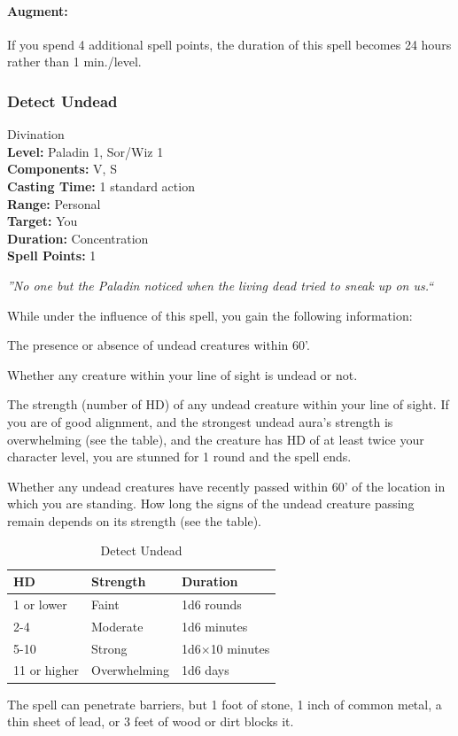 \paragraph{Augment:} If you spend 4 additional spell points, the duration of this spell becomes 24 hours rather than 1 min./level.
\subsubsection{Detect Undead}
\label{Spell:DetectUndead}
Divination
\\ \textbf{Level:} Paladin 1, Sor/Wiz 1
\\ \textbf{Components:} V, S
\\ \textbf{Casting Time:} 1 standard action
\\ \textbf{Range:} Personal
\\ \textbf{Target:} You
\\ \textbf{Duration:} Concentration
\\ \textbf{Spell Points:} 1

\emph{''No one but the Paladin noticed when the living dead tried to sneak up on us.``}

While under the influence of this spell, you gain the following information:
\begin{list}{}{\leftmargin=1em}
 \item The presence or absence of undead creatures within 60'.
 \item Whether any creature within your line of sight is undead or not.
 \item The strength (number of HD) of any undead creature within your line of sight.
If you are of good alignment, and the strongest undead aura's strength is overwhelming (see the  table), 
and the creature has HD of at least twice your character level, you are stunned for 1 round and the spell ends.
 \item Whether any undead creatures have recently passed within 60' of the location in which you are standing.
How long the signs of the undead creature passing remain depends on its strength (see the  table).
\end{list}
\begin{table}
\label{tab:DetectUndead}
\caption{Detect Undead}
\centering
\begin{tabular}{|lll|}
\hline
HD&Strength&Duration\\
\hline
1 or lower&Faint&1d6 rounds\\
2-4&Moderate&1d6 minutes\\
5-10&Strong&1d6$\times$10 minutes\\
11 or higher&Overwhelming& 1d6 days\\
\hline
\end{tabular}
\end{table}
The spell can penetrate barriers, but 1 foot of stone, 
1 inch of common metal, a thin sheet of lead, or 3 feet of wood or dirt blocks it.

